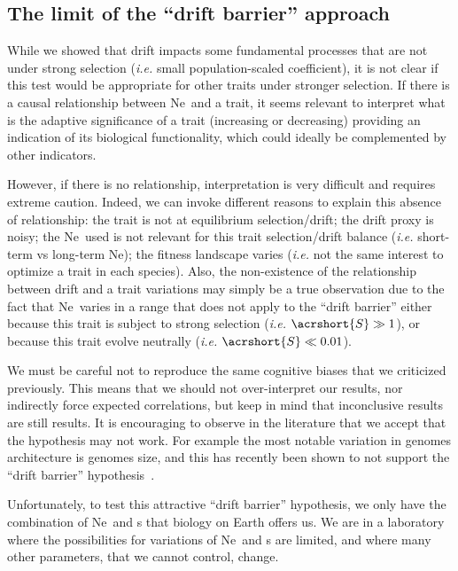 \subsection{The limit of the “drift barrier” approach}

While we showed that drift impacts some fundamental processes that are not under strong selection (\textit{i.e.} small population-scaled coefficient), it is not clear if this test would be appropriate for other traits under stronger selection. If there is a causal relationship between \acrshort{Ne}~and a trait, it seems relevant to interpret what is the adaptive significance of a trait (increasing or decreasing) providing an indication of its biological functionality, which could ideally be complemented by other indicators.

However, if there is no relationship, interpretation is very difficult and requires extreme caution. Indeed, we can invoke different reasons to explain this absence of relationship: the trait is not at equilibrium selection/drift; the drift proxy is noisy; the \acrshort{Ne}~used is not relevant for this trait selection/drift balance (\textit{i.e.} short-term vs long-term \acrshort{Ne}); the fitness landscape varies (\textit{i.e.} not the same interest to optimize a trait in each species). Also, the non-existence of the relationship between drift and a trait variations may simply be a true observation due to the fact that \acrshort{Ne}~varies in a range that does not apply to the “drift barrier” either because this trait is subject to strong selection (\textit{i.e.} $\acrshort{S} \gg 1$), or because this trait evolve neutrally (\textit{i.e.} $\acrshort{S} \ll 0.01$).

We must be careful not to reproduce the same cognitive biases that we criticized previously. This means that we should not over-interpret our results, nor indirectly force expected correlations, but keep in mind that inconclusive results are still results. It is encouraging to observe in the literature that we accept that the hypothesis may not work. For example the most notable variation in genomes architecture is genomes size, and this has recently been shown to not support the “drift barrier” hypothesis~\citep{roddy_mammals_2021, marino_effective_2024}.

Unfortunately, to test this attractive “drift barrier” hypothesis, we only have the combination of \acrshort{Ne}~and \acrshort{s} that biology on Earth offers us. We are in a laboratory where the possibilities for variations of \acrshort{Ne}~and \acrshort{s} are limited, and where many other parameters, that we cannot control, change.


